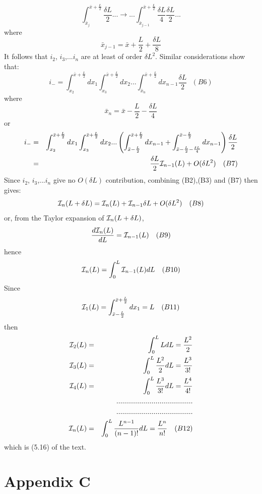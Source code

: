 \documentclass [12pt]{article}
\begin{document}
{\[\int_{\bar{x}_j}^{\bar{x} +\frac{L}{2}} \frac{\delta L}{2}
 ...   \rightarrow... \int_{\bar{x}_{j-1}}^{\bar{x} +\frac{L}{2}}
   \frac{\delta L}{4} \frac{\delta L}{2}...\]
      where   
    \[\bar{x}_{j-1} = \bar{x} +\frac{L}{2}+ \frac{\delta L}{8} \]
   It follows that $i_2$, $i_3$,...$i_n$ are at least of order $\delta L^2$.
   Similar considerations show that:
 \[    i_-  =  \int_{x_2}^{\bar{x} +\frac{L}{2}} d x_1 
   \int_{x_3}^{\bar{x} +\frac{L}{2}} d x_2...
 \int_{\bar{x}_n}^{\bar{x} +\frac{L}{2}} d x_{n-1} \frac{\delta L}{2}~~~(B6) \]
  where
  \[\bar{x}_n = \bar{x} -\frac{L}{2}- \frac{\delta L}{4} \]
  or 
   \begin{eqnarray}
    i_- &  =  & \int_{x_2}^{\bar{x} +\frac{L}{2}} d x_1 
   \int_{x_3}^{\bar{x} +\frac{L}{2}} d x_2...\left(
 \int_{\bar{x} -\frac{L}{2}}^{\bar{x} +\frac{L}{2}} d x_{n-1}+ 
    \int_{\bar{x} -\frac{L}{2}- \frac{\delta L}{4}}^{\bar{x} -\frac{L}{2}} d x_{n-1}
    \right) \frac{\delta L}{2} \nonumber \\
   & = &  \frac{\delta L}{2}{\cal I}_{n-1}(L)+ O(\delta L^2) \nonumber  ~~~(B7)
  \end{eqnarray}
   Since  $i_2$, $i_3$,...$i_n$ give no $O(\delta L)$ contribution, combining
 (B2),(B3) and (B7) then gives:
  \[{\cal I}_{n}(L+\delta L) = {\cal I}_{n}(L) + {\cal I}_{n-1}\delta L + O(\delta L^2)~~~(B8)\]
   or, from the Taylor expansion of ${\cal I}_{n}(L+\delta L)$,
   \[ \frac{ d{\cal I}_{n}(L)}{dL} =  {\cal I}_{n-1}(L)~~~(B9)\]
   hence
   \[ {\cal I}_{n}(L) = \int_{0}^{L} {\cal I}_{n-1}(L) dL~~~(B10)\]
    Since
   \[  {\cal I}_{1}(L) = \int_{\bar{x} -\frac{L}{2}}^{\bar{x} +\frac{L}{2}}d x_1 = L~~~(B11) \]
    then 
     \begin{eqnarray}
     {\cal I}_{2}(L) &  = &  \int_{0}^{L} LdL = \frac{L^2}{2} \nonumber \\
     {\cal I}_{3}(L) &  = &  \int_{0}^{L} \frac{L^2}{2} dL = \frac{L^3}{3!} \nonumber \\
      {\cal I}_{4}(L) &  = &  \int_{0}^{L} \frac{L^3}{3!} dL = \frac{L^4}{4!} \nonumber \\
           &   &....................................... \nonumber \\
           &   &....................................... \nonumber \\
    {\cal I}_{n}(L) &  = &  \int_{0}^{L} \frac{L^{n-1}}{(n-1)!} dL = \frac{L^n}{n!}
    \nonumber ~~~(B12)
    \end{eqnarray}
     which is (5.16) of the text.


  \section*{Appendix C}
  
}
\end{document}
